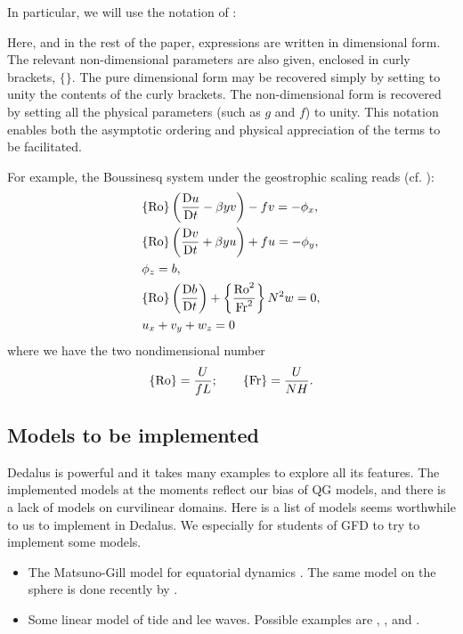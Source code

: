 In particular, we will use the notation of \cite{Vallis_96a}:
\begin{displayquote}
    Here, and in the rest of the paper, expressions are written in dimensional form. The relevant non-dimensional parameters are also given, enclosed in curly brackets, $\{\}$. The pure dimensional form may be recovered simply by setting to unity the contents of the curly brackets. The non-dimensional form is recovered by setting all the physical parameters (such as $g$ and $f$) to unity. This notation enables both the asymptotic ordering and physical appreciation of the terms to be facilitated.
\end{displayquote}
For example, the Boussinesq system under the geostrophic scaling reads (cf. \cite[(PE.1-4)]{Vallis_17}):
\begin{align}
    &\{\text{Ro}\}\left(\frac{\mathrm{D} u}{\mathrm{D} t}-\beta y v\right)-fv = -\phi_x,\\
    &\{\text{Ro}\}\left(\frac{\mathrm{D} v}{\mathrm{D} t}+\beta y u\right)+fu = -\phi_y,\\
    &\phi_z = b,\\
    &\{\text{Ro}\}\left(\frac{\mathrm{D} b}{\mathrm{D} t}\right)+\left\{\frac{\text{Ro}^2}{\text{Fr}^2}\right\} N^2w = 0,\\
    &u_x+v_y+w_z = 0
\end{align}
where we have the two nondimensional number
\begin{align}
    \{\text{Ro}\} = \frac{U}{fL};\qquad \{\text{Fr}\} = \frac{U}{NH}.
\end{align}

\subsection{Models to be implemented}
Dedalus is powerful and it takes many examples to explore all its features. The implemented models at the moments reflect our bias of QG models, and there is a lack of models on curvilinear domains. Here is a list of models seems worthwhile to us to implement in Dedalus. We especially for students of GFD to try to implement some models. 

\begin{itemize}
    \item The Matsuno-Gill model for equatorial dynamics \parencite{Matsuno_66,Gill_80}. The same model on the sphere is done recently by \cite{ShamirEtAl_23}.
    \item Some linear model of tide and lee waves. Possible examples are \cite{SmithYoung_02}, \cite[(13.2)]{Cushman-RoisinBeckers_11}, and \cite{NikurashinFerrari_10}. 
\end{itemize}
